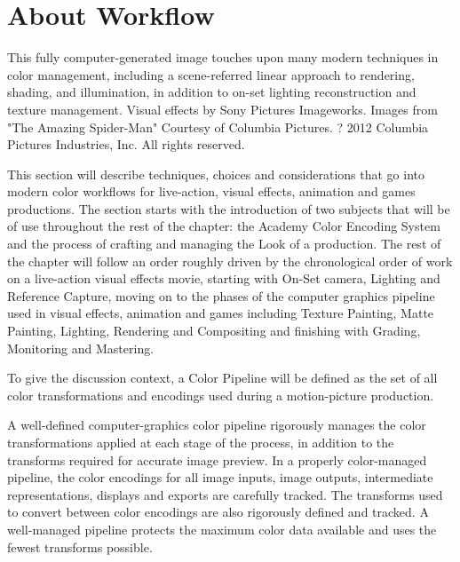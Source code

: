 \section{About Workflow}%
\label{sec:about-workflow}

This fully computer-generated image touches upon many modern techniques in color management, including a scene-referred linear approach to rendering, shading, and illumination, in addition to on-set lighting reconstruction and texture management.
Visual effects by Sony Pictures Imageworks. Images from "The Amazing Spider-Man" Courtesy of Columbia Pictures. ? 2012 Columbia Pictures Industries, Inc. All rights reserved.

This section will describe techniques, choices and considerations that go into modern color workflows for live-action, visual effects, animation and games productions. The section starts with the introduction of two subjects that will be of use throughout the rest of the chapter: the Academy Color Encoding System and the process of crafting and managing the Look of a production. The rest of the chapter will follow an order roughly driven by the chronological order of work on a live-action visual effects movie, starting with On-Set camera, Lighting and Reference Capture, moving on to the phases of the computer graphics pipeline used in visual effects, animation and games including Texture Painting, Matte Painting, Lighting, Rendering and Compositing and finishing with Grading, Monitoring and Mastering.

To give the discussion context, a Color Pipeline will be defined as the set of all color transformations and encodings used during a motion-picture production.

A well-defined computer-graphics color pipeline rigorously manages the color transformations applied at each stage of the process, in addition to the transforms required for accurate image preview.
In a properly color-managed pipeline, the color encodings for all image inputs, image outputs, intermediate representations, displays and exports are carefully tracked. The transforms used to convert between color encodings are also rigorously defined and tracked. A well-managed pipeline protects the maximum color data available and uses the fewest transforms possible.
